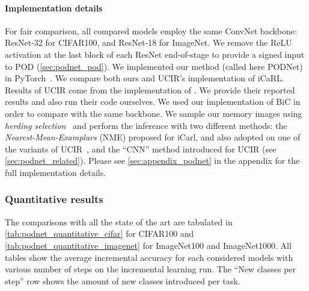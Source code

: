 \paragraph{Implementation details} For fair comparison, all compared models employ the same \ac{ConvNet}
backbone: ResNet-32 for CIFAR100, and ResNet-18 for ImageNet. We remove the ReLU activation at the
last block of each ResNet end-of-stage to provide a signed input to POD
(\autoref{sec:podnet_pod}). We implemented our method (called here \ac{PODNet}) in
PyTorch~\citep{paszke2017pytorch}.
%
We compare both ours and UCIR's implementation of iCaRL. Results of UCIR come
from the implementation of \cite{hou2019ucir}. We provide their reported results and
also run their code ourselves. We used our implementation of BiC \citep{wu2019bias_correction} in order to compare with the same
backbone.
%
We sample our memory images using \textit{herding selection}~\citep{rebuffi2017icarl} and perform
the inference with two different methods: the \textit{Nearest-Mean-Examplars} (\ac{NME}) proposed for
iCarl, and also adopted on one of the variants of UCIR~\citep{hou2019ucir}, and the ``CNN'' method
introduced for UCIR (see \autoref{sec:podnet_related}).
%
Please see \autoref{sec:appendix_podnet} in the appendix for the full implementation details.






\subsubsection{Quantitative results}
\label{sec:podnet_quantitative_results}

The comparisons with all the state of the art are tabulated in
\autoref{tab:podnet_quantitative_cifar} for CIFAR100 and \autoref{tab:podnet_quantitative_imagenet}
for ImageNet100 and ImageNet1000. All tables show the average incremental accuracy for each
considered models with various number of steps on the incremental learning run. The ``New classes
per step'' row shows the amount of new classes introduced per task.

